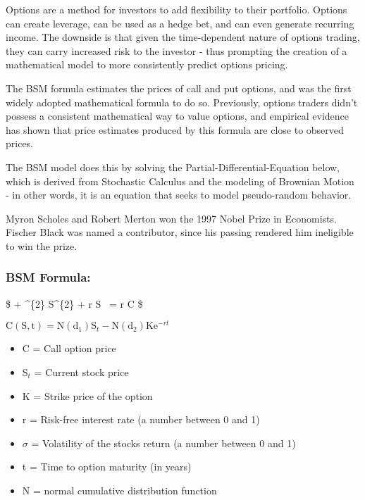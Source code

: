 \documentclass[11pt]{article}
\providecommand{\tightlist}{%
      \setlength{\itemsep}{0pt}\setlength{\parskip}{0pt}}
\begin{document}
Options are a method for investors to add flexibility to their
portfolio. Options can create leverage, can be used as a hedge bet, and
can even generate recurring income. The downside is that given the
time-dependent nature of options trading, they can carry increased risk
to the investor - thus prompting the creation of a mathematical model to
more consistently predict options pricing.

The BSM formula estimates the prices of call and put options, and was
the first widely adopted mathematical formula to do so. Previously,
options traders didn't possess a consistent mathematical way to value
options, and empirical evidence has shown that price estimates produced
by this formula are close to observed prices.

The BSM model does this by solving the Partial-Differential-Equation
below, which is derived from Stochastic Calculus and the modeling of
Brownian Motion - in other words, it is an equation that seeks to model
pseudo-random behavior.

Myron Scholes and Robert Merton won the 1997 Nobel Prize in Economists.
Fischer Black was named a contributor, since his passing rendered him
ineligible to win the prize.

    \hypertarget{bsm-formula}{%
\subsubsection{BSM Formula:}\label{bsm-formula}}

\$ +
\sigma\^{}\{2\} \mathrm S\^{}\{2\}
 + \mathrm r
\mathrm S ~= \mathrm r
\mathrm C \$

\(\mathrm C(\mathrm S,\mathrm t)= \mathrm N(\mathrm d_1)\mathrm S_t - \mathrm N(\mathrm d_2) \mathrm K \mathrm e^{-rt}\)

\begin{itemize}
\tightlist
\item
  C = Call option price
\item
  S\(_t\) = Current stock price
\item
  K = Strike price of the option
\item
  r = Risk-free interest rate (a number between 0 and 1)
\item
  \(\sigma\) = Volatility of the stocks return (a number between 0 and
  1)
\item
  t = Time to option maturity (in years)
\item
  N = normal cumulative distribution function
\end{itemize}
\end{document}
